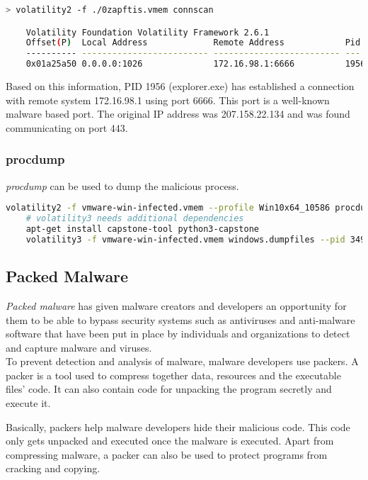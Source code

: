 \begin{lstlisting}[language=bash]
    > volatility2 -f ./0zapftis.vmem connscan

    Volatility Foundation Volatility Framework 2.6.1
    Offset(P)  Local Address             Remote Address            Pid
    ---------- ------------------------- ------------------------- ---
    0x01a25a50 0.0.0.0:1026              172.16.98.1:6666          1956
\end{lstlisting}

Based on this information, PID 1956 (explorer.exe) has established a connection with remote system 172.16.98.1 using port 6666. This port is a well-known malware based port. The original IP address was 207.158.22.134 and was found communicating on port 443.


\subsubsection{procdump}
\textit{procdump} can be used to dump the malicious process.

\begin{lstlisting}[language=bash]
    volatility2 -f vmware-win-infected.vmem --profile Win10x64_10586 procdump --pid 3496 --dump-dir .
    # volatility3 needs additional dependencies
    apt-get install capstone-tool python3-capstone
    volatility3 -f vmware-win-infected.vmem windows.dumpfiles --pid 3496
\end{lstlisting}

\subsection{Packed Malware}
\textit{Packed malware} has given malware creators and developers an opportunity for them to be able to bypass security systems such as antiviruses and anti-malware software that have been put in place by individuals and organizations to detect and capture malware and viruses.\\

To prevent detection and analysis of malware, malware developers use packers. A packer is a tool used to compress together data, resources and the executable files' code. It can also contain code for unpacking the program secretly and execute it.

Basically, packers help malware developers hide their malicious code. This code only gets unpacked and executed once the malware is executed. Apart from compressing malware, a packer can also be used to protect programs from cracking and copying.

